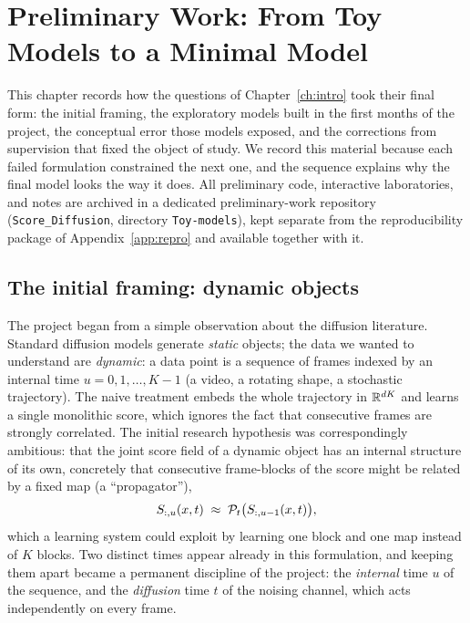 \chapter{Preliminary Work: From Toy Models to a Minimal Model}
\label{ch:development}\label{sec:development}

This chapter records how the questions of Chapter~\ref{ch:intro} took
their final form: the initial framing, the exploratory models built in
the first months of the project, the conceptual error those models
exposed, and the corrections from supervision that fixed the object of
study. We record this material because each failed formulation
constrained the next one, and the sequence explains why the final model
looks the way it does. All preliminary code, interactive laboratories,
and notes are archived in a dedicated preliminary-work repository
(\texttt{Score\_Diffusion}, directory \texttt{Toy-models}), kept
separate from the reproducibility package of Appendix~\ref{app:repro}
and available together with it.

\section{The initial framing: dynamic objects}\label{sec:dev-initial}

The project began from a simple observation about the diffusion
literature. Standard diffusion models generate \emph{static} objects; the
data we wanted to understand are \emph{dynamic}: a data point is a
sequence of frames indexed by an internal time $u = 0, 1, \dots, K-1$ (a
video, a rotating shape, a stochastic trajectory). The naive treatment
embeds the whole trajectory in $\mathbb{R}^{dK}$ and learns a single monolithic
score, which ignores the fact that consecutive frames are strongly
correlated. The initial research hypothesis was correspondingly
ambitious: that the joint score field of a dynamic object has an internal
structure of its own, concretely that consecutive frame-blocks of the
score might be related by a fixed map (a ``propagator''),
\begin{equation}
  S_{:,u}(x, t) \;\approx\; \mathcal{P}_t\big( S_{:,u-1}(x, t) \big),
  \label{eq:dev-propagator}
\end{equation}
which a learning system could exploit by learning one block and one map
instead of $K$ blocks. Two distinct times appear already in this
formulation, and keeping them apart became a permanent discipline of the
project: the \emph{internal} time $u$ of the sequence, and the
\emph{diffusion} time $t$ of the noising channel, which acts
independently on every frame.

